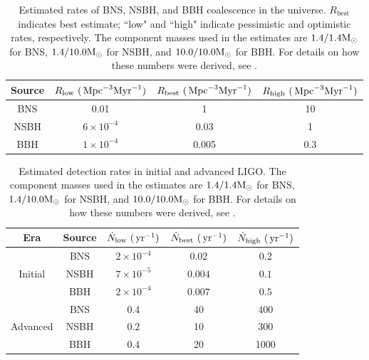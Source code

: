 \begin{table}[p]
\center
\begin{tabular}{ c | c | c | c }
\hline
Source  &   $R_{\mathrm{low}}~(\,\mathrm{Mpc}^{-3}\mathrm{Myr}^{-1})$    &   $R_{\mathrm{best}}~(\,\mathrm{Mpc}^{-3}\mathrm{Myr}^{-1})$   &   $R_{\mathrm{high}}~(\,\mathrm{Mpc}^{-3}\mathrm{Myr}^{-1})$ \\
\hline
BNS    & 0.01  &   1   &   10 \\
NSBH   & $6\times10^{-4}$   &   0.03    & 1 \\
BBH    & $1\times10^{-4}$  &   0.005   &   0.3 \\
\hline
\end{tabular}
\caption{Estimated rates of BNS, NSBH, and BBH coalescence in the universe. $R_{\mathrm{best}}$ indicates best estimate; ``low" and ``high" indicate pessimistic and optimistic rates, respectively. The component masses used in the estimates are $1.4/1.4\mathrm{M_\odot}$ for BNS, $1.4/10.0\mathrm{M_\odot}$ for NSBH, and $10.0/10.0\mathrm{M_\odot}$ for BBH. For details on how these numbers were derived, see \cite{ratesdoc}.}
\label{tab:bns_bbh_rates}
\end{table}

\begin{table}[p]
\center
\begin{tabular}{ c | c | c | c | c }
\hline
Era &   Source  &   $\dot{N}_{\mathrm{low}}~(\,\mathrm{yr}^{-1})$    &   $\dot{N}_{\mathrm{best}}~(\,\mathrm{yr}^{-1})$   &   $\dot{N}_{\mathrm{high}}~(\,\mathrm{yr}^{-1})$ \\
\hline
\multirow{3}{*}{Initial}    &   BNS    & $2\times 10^{-4}$ & 0.02    &   0.2 \\
    &   NSBH & $7\times10^{-5}$    &   $0.004$ &   $0.1$ \\
    &   BBH  & $2\times10^{-4}$    &   $0.007$ &   $0.5$ \\
\hline
\multirow{3}{*}{Advanced}    &  BNS    &  0.4    &   40  &   400 \\
    &   NSBH   &   0.2 &   10  &   300 \\
    &   BBH    &   0.4 &   20  &   1000 \\
\hline
\end{tabular}
\caption{Estimated detection rates in initial and advanced LIGO. The component masses used in the estimates are $1.4/1.4\mathrm{M_\odot}$ for BNS, $1.4/10.0\mathrm{M_\odot}$ for NSBH, and $10.0/10.0\mathrm{M_\odot}$ for BBH. For details on how these numbers were derived, see \cite{ratesdoc}.}
\label{tab:detection_rates}
\end{table}

